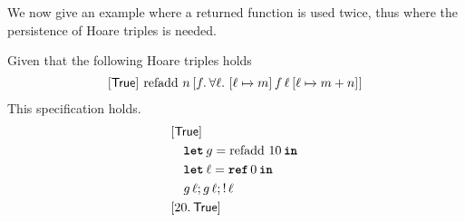 \documentclass[thesis.tex]{subfiles}
\begin{document}
We now give an example where a returned function is used twice, thus where the persistence of Hoare triples is needed.
\begin{lemma}
  Given that the following Hoare triples holds $$\hoare{\TRUE}{\operatorname{refadd}\, n}{\Ret f. {\forall \loc.\ \hoare{\loc \fmapsto m}{f\, \loc}{\loc\fmapsto m + n}}}$$
  This specification holds.
  \[
    \begin{aligned}
       & \rightbracket{\TRUE}                         \\
       & \quad \Let g = \operatorname{refadd}\, 10 in \\
       & \quad \Let \loc = \Alloc 0 in                \\
       & \quad g\, \loc; g\, \loc; \deref \loc        \\
       & \rightbracket{\Ret 20. \TRUE}
    \end{aligned}
  \]
\end{lemma}
\end{document}
